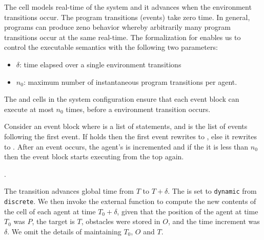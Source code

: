 The  cell models real-time  of the system and it advances when the environment transitions occur. The program transitions (events) take zero time. In general, \rolang programs can produce zeno behavior whereby arbitrarily many program transitions occur at the same real-time. The \K formalization for \rolang enables us to control the executable semantics with the following two parameters:
 \begin{itemize}
 \item $\delta$: time elapsed over a single environment transitions 
 \item $n_0$: maximum number of instantaneous program transitions per agent.
 \end{itemize}
  The  and  cells in the system configuration ensure that each event block can execute at most ${n_0}$ times, before a environment transition occurs. 
 
Consider an event block  where  is a list of statements, and  is the list of events following the first event. If  holds then the first event rewrites to , else it  rewrites to .  
After an event occurs, the agent's  is incremented and if the it is less than $n_0$ then the event block starts executing from the top again.

.

	The  transition advances global time from  $T$ to $T+\delta$. The  is set to \verb|dynamic| from \verb|discrete|. 
	We then invoke the external function  to compute the new contents of the  cell of each agent at time $T_0 +\delta$, given that the position of the agent at time $T_0$ was $P$, the target  is $T$, obstacles were stored in $O$, and the time increment was $\delta$. We omit the details of maintaining $T_0$, $O$ and $T$.
%	


